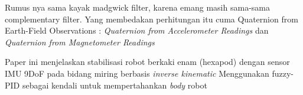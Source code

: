 \documentclass{article}
\begin{document}
Rumus nya sama kayak madgwick filter, karena emang masih sama-sama complementary filter. Yang membedakan perhitungan itu cuma Quaternion from Earth-Field Observations :\emph{ Quaternion from Accelerometer Readings} dan \emph{ Quaternion from Magnetometer Readings}

\cite{Asrofi2015} Paper ini menjelaskan stabilisasi robot berkaki enam (hexapod) dengan sensor IMU 9DoF pada bidang miring berbasis \emph{inverse kinematic}
Menggunakan fuzzy-PID sebagai kendali untuk mempertahankan \emph{body} robot



\end{document}
